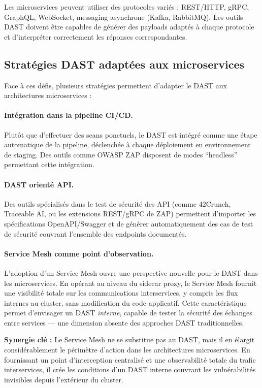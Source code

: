 Les microservices peuvent utiliser des protocoles variés : REST/HTTP, gRPC,
GraphQL, WebSocket, messaging asynchrone (Kafka, RabbitMQ). Les outils DAST
doivent être capables de générer des payloads adaptés à chaque protocole
et d'interpréter correctement les réponses correspondantes.

\subsection{Stratégies DAST adaptées aux microservices}

Face à ces défis, plusieurs stratégies permettent d'adapter le DAST aux
architectures microservices :

\paragraph{Intégration dans la pipeline CI/CD.}
Plutôt que d'effectuer des scans ponctuels, le DAST est intégré comme une
étape automatique de la pipeline, déclenchée à chaque déploiement en
environnement de staging. Des outils comme OWASP ZAP disposent de modes
``headless'' permettant cette intégration.

\paragraph{DAST orienté API.}
Des outils spécialisés dans le test de sécurité des API (comme 42Crunch,
Traceable AI, ou les extensions REST/gRPC de ZAP) permettent d'importer
les spécifications OpenAPI/Swagger et de générer automatiquement des cas
de test de sécurité couvrant l'ensemble des endpoints documentés.

\paragraph{Service Mesh comme point d'observation.}
L'adoption d'un Service Mesh ouvre une perspective nouvelle pour le DAST
dans les microservices. En opérant au niveau du sidecar proxy, le Service Mesh
fournit une visibilité totale sur les communications interservices, y compris
les flux internes au cluster, sans modification du code applicatif. Cette
caractéristique permet d'envisager un DAST \textit{interne}, capable de
tester la sécurité des échanges entre services --- une dimension absente
des approches DAST traditionnelles.

\begin{importantbox}
  \textbf{Synergie clé :} Le Service Mesh ne se substitue pas au DAST, mais
  il en élargit considérablement le périmètre d'action dans les architectures
  microservices. En fournissant un point d'interception centralisé et une
  observabilité totale du trafic interservices, il crée les conditions d'un
  DAST interne couvrant les vulnérabilités invisibles depuis l'extérieur
  du cluster.
\end{importantbox}

